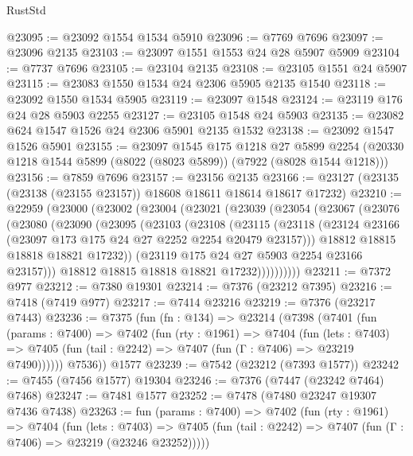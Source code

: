\begin{lexlean}{RustStd}
\begin{coremodule}
@23095 := @23092 @1554 @1534 @5910
@23096 := @7769 @7696
@23097 := @23096 @2135
@23103 := @23097 @1551 @1553 @24 @28 @5907 @5909
@23104 := @7737 @7696
@23105 := @23104 @2135
@23108 := @23105 @1551 @24 @5907
@23115 := @23083 @1550 @1534 @24 @2306 @5905 @2135 @1540
@23118 := @23092 @1550 @1534 @5905
@23119 := @23097 @1548
@23124 := @23119 @176 @24 @28 @5903 @2255
@23127 := @23105 @1548 @24 @5903
@23135 := @23082 @624 @1547 @1526 @24 @2306 @5901 @2135 @1532
@23138 := @23092 @1547 @1526 @5901
@23155 := @23097
    @1545
    @175
    @1218
    @27
    @5899
    @2254
    (@20330 @1218 @1544 @5899 (@8022 (@8023 @5899)) (@7922 (@8028 @1544 @1218)))
@23156 := @7859 @7696
@23157 := @23156 @2135
@23166 := @23127 (@23135 (@23138 (@23155 @23157)) @18608 @18611 @18614 @18617 @17232)
@23210 := @22959
    (@23000
      (@23002
        (@23004
          (@23021
            (@23039
              (@23054
                (@23067
                  (@23076
                    (@23080
                      (@23090
                        (@23095
                          (@23103
                            (@23108
                              (@23115
                                (@23118
                                  (@23124
                                    @23166
                                    (@23097 @173 @175 @24 @27 @2252 @2254 @20479 @23157)))
                                @18812
                                @18815
                                @18818
                                @18821
                                @17232))
                            (@23119 @175 @24 @27 @5903 @2254 @23166 @23157)))
                        @18812
                        @18815
                        @18818
                        @18821
                        @17232))))))))))
@23211 := @7372 @977
@23212 := @7380 @19301
@23214 := @7376 (@23212 @7395)
@23216 := @7418 (@7419 @977)
@23217 := @7414 @23216
@23219 := @7376 (@23217 @7443)
@23236 := @7375
    (fun (fn : @134) =>
    @23214
      (@7398
        (@7401
          (fun (params : @7400) =>
          @7402
            (fun (rty : @1961) =>
            @7404
              (fun (lets : @7403) =>
              @7405 (fun (tail : @2242) => @7407 (fun (Γ : @7406) => @23219 @7490))))))
        @7536))
    @1577
@23239 := @7542 (@23212 (@7393 @1577))
@23242 := @7455 (@7456 @1577) @19304
@23246 := @7376 (@7447 (@23242 @7464) @7468)
@23247 := @7481 @1577
@23252 := @7478 (@7480 @23247 @19307 @7436 @7438)
@23263 := fun (params : @7400) =>
  @7402
    (fun (rty : @1961) =>
    @7404
      (fun (lets : @7403) =>
      @7405 (fun (tail : @2242) => @7407 (fun (Γ : @7406) => @23219 (@23246 @23252)))))

\end{coremodule}
\end{lexlean}
